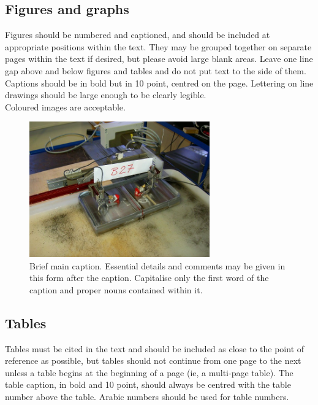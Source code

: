 \documentclass[12pt, a4paper]{article}
\begin{document}
\subsection{Figures and graphs}
Figures should be numbered and captioned, and should be included at appropriate positions within the text. They may be grouped together on separate pages within the text if desired, but please avoid large blank areas. Leave one line gap above and below figures and tables and do not put text to the side of them. Captions should be in bold but in 10 point, centred on the page. Lettering on line drawings should be large enough to be clearly legible.\\

Coloured images are acceptable.
\begin{figure}[H]
  \centering
  \includegraphics[height=5.84cm, width=7.78cm]{./figures/example-figure}
  \caption{Brief main caption. Essential details and comments may be given in this form after the caption. Capitalise only the first word of the caption and proper nouns contained within it.}\label{fig:my_label}
\end{figure}

\subsection{Tables}
Tables must be cited in the text and should be included as close to the point of reference as possible, but tables should not continue from one page to the next unless a table begins at the beginning of a page (ie, a multi-page table). The table caption, in bold and 10 point, should always be centred with the table number above the table. Arabic numbers should be used for table numbers.
\end{document}
